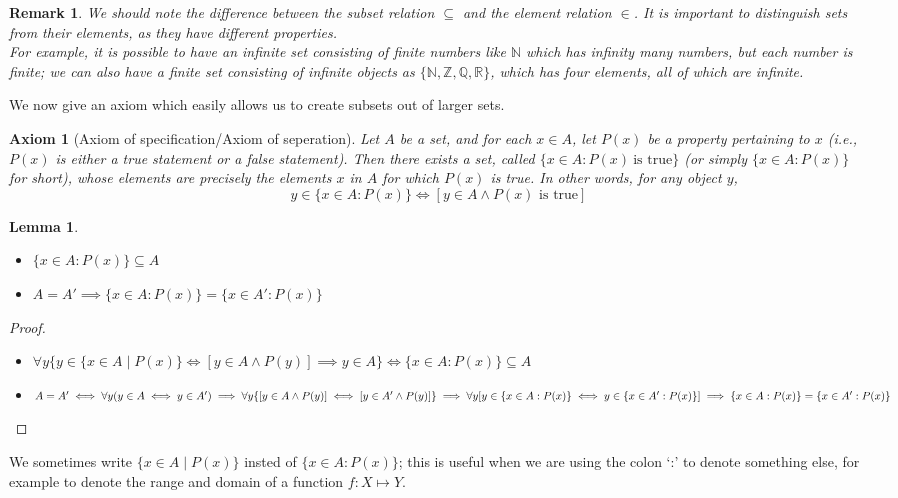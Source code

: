 \documentclass[a4paper,oneside]{book}
\newtheorem*{proof}{\textit{Proof.}}
\newtheorem{axiom}{Axiom}[chapter]
\newtheorem{lemma}{Lemma}[section]
\newtheorem{remark}{Remark}[section]
\begin{document}
			\begin{remark}
				We should note the difference between the subset relation $\subseteq$ and the element relation $\in$. It is important to distinguish sets from their elements, as they have different properties.\\
				For example, it is possible to have an infinite set consisting of finite numbers like $\mathbb{N}$ which has infinity many numbers, but each number is finite; we can also have a finite set consisting of infinite objects as $\{\mathbb{N},\mathbb{Z},\mathbb{Q},\mathbb{R}\}$, which has four elements, all of which are infinite.
			\end{remark}
			We now give an axiom which easily allows us to create subsets out of larger sets.
			\begin{axiom}[Axiom of specification/Axiom of seperation]
				Let $A$ be a set, and for each $x\in A$, let $P(x)$ be a property pertaining to $x$ (\textit{i.e.,} $P(x)$ is either a true statement or a false statement). Then there exists a set, called $\{x\in A:P(x)~\textrm{is~true}\}$ (or simply $\{x\in A:P(x)\}$ for short), whose elements are precisely the elements $x$ in $A$ for which $P(x)$ is true. In other words, for any object $y$, $$y\in\{x\in A:P(x)\}\iff[y\in A\land P(x)\textrm{~is~true}]$$
			\end{axiom}
			\begin{lemma}~
				\begin{itemize}
					\item $\{x\in A:P(x)\}\subseteq A$
					\item $A=A'\implies\{x\in A:P(x)\}=\{x\in A':P(x)\}$
				\end{itemize}
			\end{lemma}
			\begin{proof}~
				\begin{itemize}
					\item $\forall y\{y\in\{x\in A\mid P(x)\}\iff[y\in A\land P(y)]\implies y\in A\}\iff \{x\in A:P(x)\}\subseteq A$
					\item $A=A'\iff\forall y(y\in A\iff y\in A')\implies\forall y\{[y\in A\land P(y)]\iff[y\in A'\land P(y)]\}\\\implies\forall y[y\in\{x\in A:P(x)\}\iff y\in\{x\in A':P(x)\}]\\\implies\{x\in A:P(x)\}=\{x\in A':P(x)\}$
				\end{itemize}
			\end{proof}
			We sometimes write $\{x\in A\mid P(x)\}$ insted of $\{x\in A:P(x)\}$; this is useful when we are using the colon `:' to denote something else, for example to denote the range and domain of a function $f: X\mapsto Y$.\\
\end{document}
